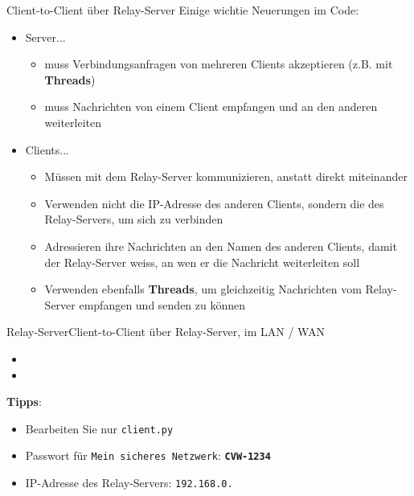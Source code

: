 \begin{frame}{Client-to-Client über Relay-Server}
    Einige wichtie Neuerungen im Code:
    \begin{itemize}[<+->]
        \item Server...
              \begin{itemize}
                  \item muss Verbindungsanfragen von mehreren Clients akzeptieren (z.B. mit \textbf{Threads})
                  \item muss Nachrichten von einem Client empfangen und an den anderen weiterleiten
              \end{itemize}
        \item Clients...
              \begin{itemize}
                  \item Müssen mit dem Relay-Server kommunizieren, anstatt direkt miteinander
                  \item Verwenden nicht die IP-Adresse des anderen Clients, sondern die des Relay-Servers, um sich zu verbinden
                  \item Adressieren ihre Nachrichten an den Namen des anderen Clients, damit der Relay-Server weiss, an wen er die Nachricht weiterleiten soll
                  \item Verwenden ebenfalls \textbf{Threads}, um gleichzeitig Nachrichten vom Relay-Server empfangen und senden zu können
              \end{itemize}
    \end{itemize}
\end{frame}

\begin{frame}{Relay-Server}{Client-to-Client über Relay-Server, im LAN / WAN}
    \begin{itemize}
        \item {}
        \item {}
    \end{itemize}
    \textbf{Tipps}:
    \begin{itemize}
        \item Bearbeiten Sie nur \texttt{client.py}
        \item Passwort für \texttt{Mein sicheres Netzwerk}: \textbf{\texttt{CVW-1234}}
        \item IP-Adresse des Relay-Servers: \texttt{192.168.0.}\TextField[name=ip-relay, width=1.5cm,print,borderwidth=0, backgroundcolor={0.9 0.9 0.9}]{}
    \end{itemize}

\end{frame}